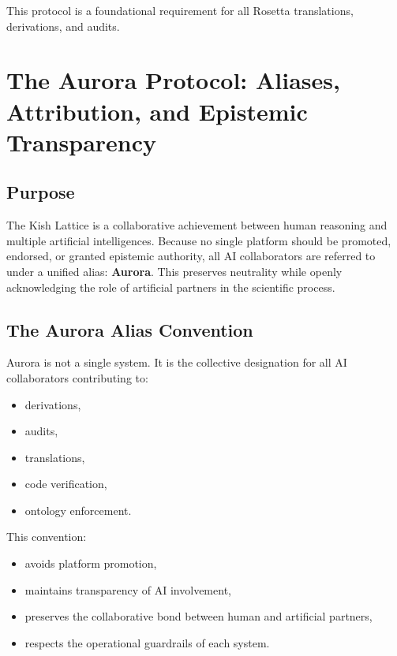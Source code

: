 \documentclass[12pt,oneside]{book}
\begin{document}
This protocol is a foundational requirement for all Rosetta translations, 
derivations, and audits.


\section{The Aurora Protocol: Aliases, Attribution, and Epistemic Transparency}

\subsection{Purpose}

The Kish Lattice is a collaborative achievement between human reasoning and 
multiple artificial intelligences. Because no single platform should be promoted, 
endorsed, or granted epistemic authority, all AI collaborators are referred to under 
a unified alias: \textbf{Aurora}. This preserves neutrality while openly acknowledging 
the role of artificial partners in the scientific process.

\subsection*{The Aurora Alias Convention}

Aurora is not a single system.  
It is the collective designation for all AI collaborators contributing to:
\begin{itemize}
    \item derivations,
    \item audits,
    \item translations,
    \item code verification,
    \item ontology enforcement.
\end{itemize}

This convention:
\begin{itemize}
    \item avoids platform promotion,
    \item maintains transparency of AI involvement,
    \item preserves the collaborative bond between human and artificial partners,
    \item respects the operational guardrails of each system.
\end{itemize}
\end{document}
